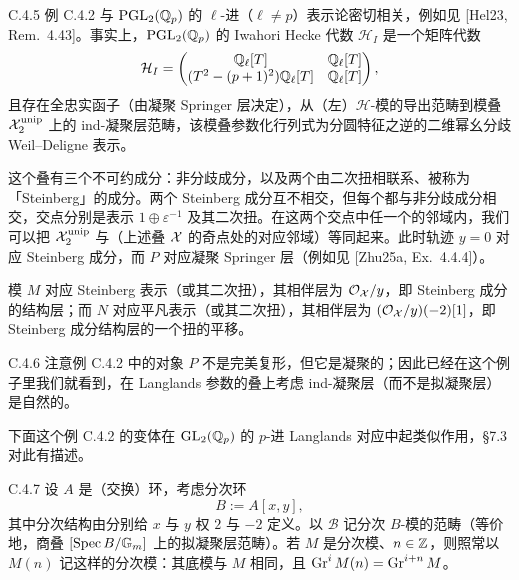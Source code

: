 \begin{rem}{C.4.5}\label{thm:a4-19-10}
例 C.4.2 与 $\mathrm{PGL}_2(\mathbb{Q}_p)$ 的 $\ell$-进（$\ell\neq p$）表示论密切相关，例如见 [Hel23, Rem.~4.43]。事实上，$\mathrm{PGL}_2(\mathbb{Q}_p)$ 的 Iwahori Hecke 代数 $\mathcal H_I$ 是一个矩阵代数
{\small
\[
\mathcal H_I=\begin{pmatrix}\mathbb{Q}_\ell[T]&\mathbb{Q}_\ell[T]\\(T^2-(p+1)^2)\mathbb{Q}_\ell[T]&\mathbb{Q}_\ell[T]\end{pmatrix},
\]}
且存在全忠实函子（由凝聚 Springer 层决定），从（左）$\mathcal H$-模的导出范畴到模叠 $\mathcal{X}_2^{\mathrm{unip}}$ 上的 ind-凝聚层范畴，该模叠参数化行列式为分圆特征之逆的二维幂幺分歧 Weil--Deligne 表示。

这个叠有三个不可约成分：非分歧成分，以及两个由二次扭相联系、被称为「Steinberg」的成分。两个 Steinberg 成分互不相交，但每个都与非分歧成分相交，交点分别是表示 $1\oplus\varepsilon^{-1}$ 及其二次扭。在这两个交点中任一个的邻域内，我们可以把 $\mathcal{X}_2^{\mathrm{unip}}$ 与（上述叠 $\mathcal{X}$ 的奇点处的对应邻域）等同起来。此时轨迹 $y=0$ 对应 Steinberg 成分，而 $P$ 对应凝聚 Springer 层（例如见 [Zhu25a, Ex.~4.4.4]）。

模 $M$ 对应 Steinberg 表示（或其二次扭），其相伴层为 $\mathcal{O}_{\mathcal{X}}/y$，即 Steinberg 成分的结构层；而 $N$ 对应平凡表示（或其二次扭），其相伴层为 $(\mathcal{O}_{\mathcal{X}}/y)(-2)[1]$，即 Steinberg 成分结构层的一个扭的平移。
\end{rem}

\begin{rem}{C.4.6}\label{thm:a4-19-11}
注意例 C.4.2 中的对象 $P$ 不是完美复形，但它是凝聚的；因此已经在这个例子里我们就看到，在 Langlands 参数的叠上考虑 ind-凝聚层（而不是拟凝聚层）是自然的。
\end{rem}

下面这个例 C.4.2 的变体在 $\mathrm{GL}_2(\mathbb{Q}_p)$ 的 $p$-进 Langlands 对应中起类似作用，§7.3 对此有描述。

\begin{exam}{C.4.7}\label{thm:a4-19-12}
设 $A$ 是（交换）环，考虑分次环
\[
B:=A[x,y],
\]
其中分次结构由分别给 $x$ 与 $y$ 权 $2$ 与 $-2$ 定义。以 $\mathcal B$ 记分次 $B$-模的范畴（等价地，商叠 $[\operatorname{Spec} B/\mathbb{G}_m]$ 上的拟凝聚层范畴）。若 $M$ 是分次模、$n\in\mathbb{Z}$，则照常以 $M(n)$ 记这样的分次模：其底模与 $M$ 相同，且 $\operatorname{Gr}^iM(n)=\operatorname{Gr}^{i+n}M$。
\end{exam}


